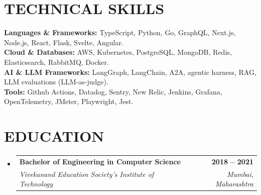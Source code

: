 \documentclass[letterpaper,11pt]{article}
\makeatletter
\newcommand{\resumeSubheading}[4]{
  \vspace{-2pt}\item
    \begin{tabular*}{1.0\textwidth}[t]{l@{\extracolsep{\fill}}r}
      \textbf{\large#1} & \textbf{\small #2} \\
      \textit{\small#3} & \textit{\small #4} \\
    \end{tabular*}\vspace{-7pt}
}
\newcommand{\resumeSubHeadingListStart}{\begin{itemize}[leftmargin=0.0in, label={}]}
\newcommand{\resumeSubHeadingListEnd}{\end{itemize}}
\makeatother
\begin{document}
\section{TECHNICAL SKILLS}
     \textbf{\normalsize{Languages \& Frameworks:}}{ \normalsize{TypeScript, Python, Go, GraphQL, Next.js, Node.js, React, Flask, Svelte, Angular.}} \\
    \vspace{4pt}
    \textbf{\normalsize{Cloud \& Databases:}}{ \normalsize{AWS, Kubernetes, PostgreSQL, MongoDB, Redis, Elasticsearch, RabbitMQ, Docker.}} \\
    \vspace{4pt}
    \textbf{\normalsize{AI \& LLM Frameworks:}}{ \normalsize{LangGraph, LangChain, A2A, agentic harness, RAG, LLM evaluations (LLM-as-judge).}} \\
    \vspace{4pt}
    \textbf{\normalsize{Tools:}}{ \normalsize{Github Actions, Datadog, Sentry, New Relic, Jenkins, Grafana, OpenTelemetry, JMeter, Playwright, Jest.}} \\

    \vspace{-6pt}
\section{EDUCATION}
    \resumeSubHeadingListStart
    \resumeSubheading
      {Bachelor of Engineering in Computer Science}{2018 -- 2021}
      {Vivekanand Education Society's Institute of Technology}{Mumbai, Maharashtra}
    \resumeSubHeadingListEnd
    \vspace{-8pt}
\end{document}
